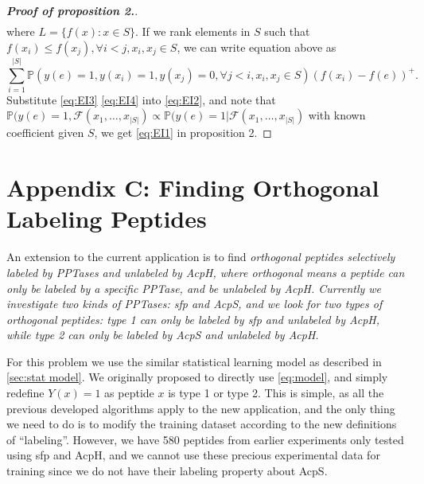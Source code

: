 \documentclass[12pt]{article}
\begin{document}
\begin{proof}[\bf{Proof of proposition 2.}]
\begin{equation*}
\begin{split}
  \end{split}
\end{equation*}
where $L = \{f(x): x \in S\}$. If we rank elements in $S$ such that $f(x_i) \leq f(x_j), \forall i<j, x_i,x_j \in S$, we can write equation above as
\begin{equation}
  \sum_{i=1}^{|S|} \mathbb{P}(y(e)=1, y(x_i)=1, y(x_j)=0, \forall j<i, x_i,x_j \in S)(f(x_i)-f(e))^+.
  \label{eq:EI4}
\end{equation}
Substitute \eqref{eq:EI3} \eqref{eq:EI4} into \eqref{eq:EI2}, and note that $\mathbb{P}(y(e)=1, \mathcal{F}(x_1,\ldots,x_{|S|}) \propto \mathbb{P}(y(e)=1| \mathcal{F}(x_1,\ldots,x_{|S|})$ with known coefficient given $S$, we get \eqref{eq:EI1} in proposition 2. 
\end{proof}

\section*{Appendix C: Finding Orthogonal Labeling Peptides}
An extension to the current application is to find \it{orthogonal} peptides selectively labeled by PPTases and unlabeled by AcpH, where \it{orthogonal} means a peptide can only be labeled by a specific PPTase, and be unlabeled by AcpH. Currently we investigate two kinds of PPTases: sfp and AcpS, and we look for two types of orthogonal peptides: type 1 can only be labeled by sfp and unlabeled by AcpH, while type 2 can only be labeled by AcpS and unlabeled by AcpH.

For this problem we use the similar statistical learning model as described in \ref{sec:stat model}. We originally proposed to directly use \eqref{eq:model}, and simply redefine $Y(x)=1$ as peptide $x$ is type 1 or type 2. This is simple, as all the previous developed algorithms apply to the new application, and the only thing we need to do is to modify the training dataset according to the new definitions of ``labeling''. However, we have 580 peptides from earlier experiments only tested using sfp and AcpH, and we cannot use these precious experimental data for training since we do not have their labeling property about AcpS. 
\end{document}
